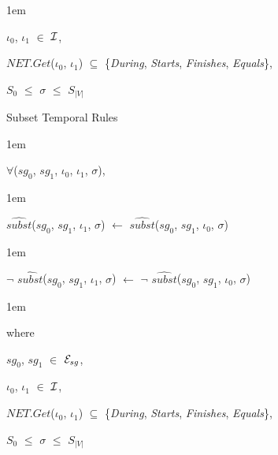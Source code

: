 \documentclass[11pt]{report}
\newenvironment{vquote}
{
  \begin{list}{}{\leftmargin 1em}\item[]
}
{
  \end{list}
}
\begin{document}
\begin{enumerate}
\begin{vquote}
                  \hspace{1em}
                  $\iota_0$, $\iota_1$ $\in$ ${\cal I}$,

                  \hspace{1em}
                  $NET.Get$($\iota_0$, $\iota_1$) $\subseteq$
                  \{{\em During}, {\em Starts}, {\em Finishes}, {\em Equals}\},

                  \hspace{1em}
                  $S_0$ $\leq$ $\sigma$ $\leq$ $S_{|V|}$
                \end{vquote}

              \item
                Subset Temporal Rules

                \begin{vquote}
                  $\forall$($sg_0$, $sg_1$, $\iota_0$, $\iota_1$, $\sigma$),
                \end{vquote}

                \begin{vquote}
                  $\hat{subst}$($sg_0$, $sg_1$, $\iota_1$, $\sigma$)
                  $\leftarrow$
                  $\hat{subst}$($sg_0$, $sg_1$, $\iota_0$, $\sigma$)
                \end{vquote}

                \begin{vquote}
                  $\lnot$ $\hat{subst}$($sg_0$, $sg_1$, $\iota_1$, $\sigma$)
                  $\leftarrow$
                  $\lnot$ $\hat{subst}$($sg_0$, $sg_1$, $\iota_0$, $\sigma$)
                \end{vquote}

                \begin{vquote}
                  where

                  \hspace{1em}
                  $sg_0$, $sg_1$ $\in$ ${\cal E}_{sg}$,

                  \hspace{1em}
                  $\iota_0$, $\iota_1$ $\in$ ${\cal I}$,

                  \hspace{1em}
                  $NET.Get$($\iota_0$, $\iota_1$) $\subseteq$
                  \{{\em During}, {\em Starts}, {\em Finishes}, {\em Equals}\},

                  \hspace{1em}
                  $S_0$ $\leq$ $\sigma$ $\leq$ $S_{|V|}$
                \end{vquote}


\end{enumerate}
\end{document}
